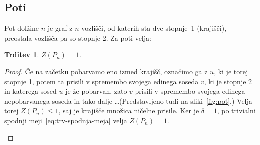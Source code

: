 \documentclass[12pt,a4paper,twoside]{article}
\theoremstyle{definition} %
\theoremstyle{plain} %
\newtheorem{trditev}[definicija]{Trditev}
\numberwithin{equation}{section}  %
\begin{document}
\subsection{Poti}
Pot dolžine $n$ je graf z $n$ vozlišči, od katerih sta dve stopnje~1 (krajišči), preostala vozlišča pa so stopnje 2. Za poti velja: 
\begin{trditev}
    $Z(P_n) = 1$.
    \label{trd:pot}
\end{trditev}
\begin{proof}
    Če na začetku pobarvamo eno izmed krajišč, označimo ga z $u$, ki je torej stopnje 1, potem ta prisili v spremembo svojega edinega soseda $v$, ki je stopnje 2 in katerega sosed $u$ je že pobarvan, zato $v$ prisili v spremembo svojega edinega nepobarvanega soseda in tako dalje \ldots (Predstavljeno tudi na sliki~\ref{fig:pot}.) Velja torej $Z(P_n) \leq 1$, saj je krajišče množica ničelne prisile. Ker je $\delta = 1$, po trivialni spodnji meji~\ref{eq:trv-spodnja-meja} velja $Z(P_n) = 1$.
    \begin{figure}[h]
        \begin{subfigure}{0.5\textwidth}
            \centering
        \end{subfigure}
        \begin{subfigure}{0.49\textwidth}
            \centering
\end{subfigure}
\end{figure}
\end{proof}
\end{document}

